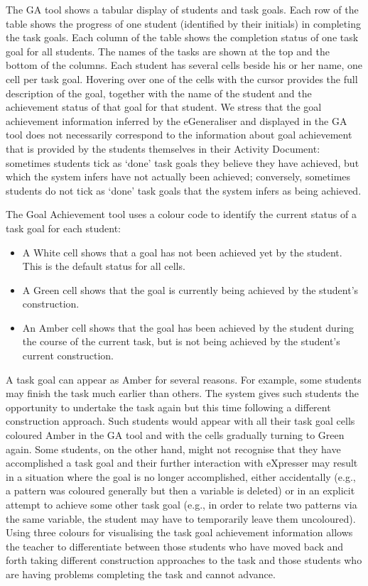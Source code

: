 The GA tool shows a tabular display of students and task goals. Each
row of the table shows the progress of one student (identified by
their initials) in completing the task goals. Each column of the table
shows the completion status of one task goal for all students. The
names of the tasks are shown at the top and the bottom of the
columns. Each student has several cells beside his or her name, one
cell per task goal. Hovering over one of the cells with the cursor
provides the full description of the goal, together with the name of
the student and the achievement status of that goal for that
student. We stress that the goal achievement information inferred by
the eGeneraliser and displayed in the GA tool does not necessarily
correspond to the information about goal achievement that is provided
by the students themselves in their Activity Document: sometimes
students tick as `done’ task goals they believe they have achieved,
but which the system infers have not actually been achieved;
conversely, sometimes students do not tick as `done’ task goals that
the system infers as being achieved.
 
The Goal Achievement tool uses a colour code to identify the current
status of a task goal for each student:

\begin{itemize}
\item A White cell shows that a goal has not been achieved yet by the
student. This is the default status for all cells.
\item A Green cell
shows that the goal is currently being achieved by the student’s
construction.
\item An Amber cell shows that the goal has been achieved
by the student during the course of the current task, but is not being
achieved by the student’s current construction.
\end{itemize}


A task goal can appear as Amber for several reasons. For example, some
students may finish the task much earlier than others. The system
gives such students the opportunity to undertake the task again but
this time following a different construction approach. Such students
would appear with all their task goal cells coloured Amber in the GA
tool and with the cells gradually turning to Green again. Some
students, on the other hand, might not recognise that they have
accomplished a task goal and their further interaction with eXpresser
may result in a situation where the goal is no longer accomplished,
either accidentally (e.g., a pattern was coloured generally but then a
variable is deleted) or in an explicit attempt to achieve some other
task goal (e.g., in order to relate two patterns via the same
variable, the student may have to temporarily leave them
uncoloured). Using three colours for visualising the task goal
achievement information allows the teacher to differentiate between
those students who have moved back and forth taking different
construction approaches to the task and those students who are having
problems completing the task and cannot advance.


